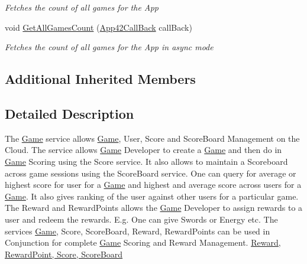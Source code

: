 \begin{DoxyCompactItemize}
\begin{DoxyCompactList}\small\item\em Fetches the count of all games for the App \end{DoxyCompactList}\item 
void \hyperlink{classcom_1_1shephertz_1_1app42_1_1paas_1_1sdk_1_1csharp_1_1game_1_1_game_service_a583f875c075496fd903a7e739d21a254}{Get\+All\+Games\+Count} (\hyperlink{interfacecom_1_1shephertz_1_1app42_1_1paas_1_1sdk_1_1csharp_1_1_app42_call_back}{App42\+Call\+Back} call\+Back)
\begin{DoxyCompactList}\small\item\em Fetches the count of all games for the App in async mode \end{DoxyCompactList}\end{DoxyCompactItemize}
\subsection*{Additional Inherited Members}


\subsection{Detailed Description}
The \hyperlink{classcom_1_1shephertz_1_1app42_1_1paas_1_1sdk_1_1csharp_1_1game_1_1_game}{Game} service allows \hyperlink{classcom_1_1shephertz_1_1app42_1_1paas_1_1sdk_1_1csharp_1_1game_1_1_game}{Game}, User, Score and Score\+Board Management on the Cloud. The service allows \hyperlink{classcom_1_1shephertz_1_1app42_1_1paas_1_1sdk_1_1csharp_1_1game_1_1_game}{Game} Developer to create a \hyperlink{classcom_1_1shephertz_1_1app42_1_1paas_1_1sdk_1_1csharp_1_1game_1_1_game}{Game} and then do in \hyperlink{classcom_1_1shephertz_1_1app42_1_1paas_1_1sdk_1_1csharp_1_1game_1_1_game}{Game} Scoring using the Score service. It also allows to maintain a Scoreboard across game sessions using the Score\+Board service. One can query for average or highest score for user for a \hyperlink{classcom_1_1shephertz_1_1app42_1_1paas_1_1sdk_1_1csharp_1_1game_1_1_game}{Game} and highest and average score across users for a \hyperlink{classcom_1_1shephertz_1_1app42_1_1paas_1_1sdk_1_1csharp_1_1game_1_1_game}{Game}. It also gives ranking of the user against other users for a particular game. The Reward and Reward\+Points allows the \hyperlink{classcom_1_1shephertz_1_1app42_1_1paas_1_1sdk_1_1csharp_1_1game_1_1_game}{Game} Developer to assign rewards to a user and redeem the rewards. E.\+g. One can give Swords or Energy etc. The services \hyperlink{classcom_1_1shephertz_1_1app42_1_1paas_1_1sdk_1_1csharp_1_1game_1_1_game}{Game}, Score, Score\+Board, Reward, Reward\+Points can be used in Conjunction for complete \hyperlink{classcom_1_1shephertz_1_1app42_1_1paas_1_1sdk_1_1csharp_1_1game_1_1_game}{Game} Scoring and Reward Management. \hyperlink{classcom_1_1shephertz_1_1app42_1_1paas_1_1sdk_1_1csharp_1_1game_1_1_game_service}{Reward, Reward\+Point, Score, Score\+Board} 



